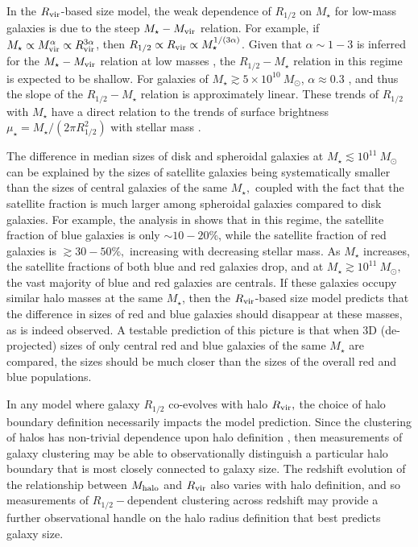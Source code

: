 \documentclass[usenatbib,usegraphicx,letterpaper]{mn2e}
\newcommand{\rhalf}{R_{1/2}}
\newcommand{\mstar}{M_{\star}}
\newcommand{\mvir}{M_{\rm vir}}
\newcommand{\mhalo}{M_{\rm halo}}
\newcommand{\rvir}{R_{\rm vir}}
\begin{document}
In the $\rvir$-based size model, the weak dependence of $\rhalf$ on $\mstar$ for low-mass galaxies is due to the steep $\mstar-\mvir$ relation. For example, if $\mstar\propto\mvir^\alpha\propto\rvir^{3\alpha}$, then $\rhalf\propto \rvir\propto \mstar^{1/(3\alpha)}$. Given that $\alpha\sim 1-3$ is inferred for the $\mstar-\mvir$ relation at low masses \citep{kravtsov10,moster_etal13,behroozi13_smhm,kravtsov_etal14}, the $\rhalf-\mstar$ relation in this regime is expected to be shallow.
For galaxies of $\mstar\gtrsim 5\times 10^{10}\ M_\odot$, $\alpha\approx 0.3$ \citep[e.g.,][]{kravtsov_etal14}, and thus
the slope of the $\rhalf-\mstar$ relation is approximately linear. These trends of $\rhalf$ with $\mstar$ have a direct relation to the trends of surface brightness $\mu_\star=\mstar/(2\pi\rhalf^2)$ with stellar mass \citep[see, for example, the $\mu_\star-$dependent clustering measurements in][which are qualitatively similar to the measurements reported here]{li_etal06}.

The difference in median sizes of disk and spheroidal galaxies at $\mstar\lesssim 10^{11}\ M_\odot$ can be explained by the sizes of satellite galaxies being systematically smaller than the sizes of central galaxies of the same $\mstar,$ coupled with the fact that the satellite fraction is much larger among spheroidal galaxies compared to disk galaxies. For example, the analysis in \citet{rodriguez_puebla_etal15} shows that in this regime, the satellite fraction of blue galaxies is only $\sim10-20\%$, while
the satellite fraction of red galaxies is $\gtrsim 30-50\%,$ increasing with decreasing stellar mass.
As $\mstar$ increases, the satellite fractions of both blue and red galaxies drop, and at $\mstar\gtrsim 10^{11}\ M_\odot,$ the vast majority of blue and red galaxies are centrals. If these galaxies occupy similar halo masses at the same $\mstar$, then the $\rvir$-based size model predicts that the difference in sizes of red and blue galaxies should disappear at these masses, as is indeed observed. A testable prediction of this picture is that when 3D (de-projected) sizes of only central red and blue galaxies of the same $\mstar$ are compared, the sizes should be much closer than the sizes of the overall red and blue populations.

In any model where galaxy $\rhalf$ co-evolves with halo $\rvir,$ the choice of halo boundary definition necessarily impacts the model prediction. Since the clustering of halos has non-trivial dependence upon halo definition \citep{villarreal_etal17}, then measurements of galaxy clustering may be able to observationally distinguish a particular halo boundary that is most closely connected to galaxy size. The redshift evolution of the relationship between $\mhalo$ and $\rvir$ also varies with halo definition, and so measurements of $\rhalf-$dependent clustering across redshift may provide a further observational handle on the halo radius definition that best predicts galaxy size.
\end{document}
